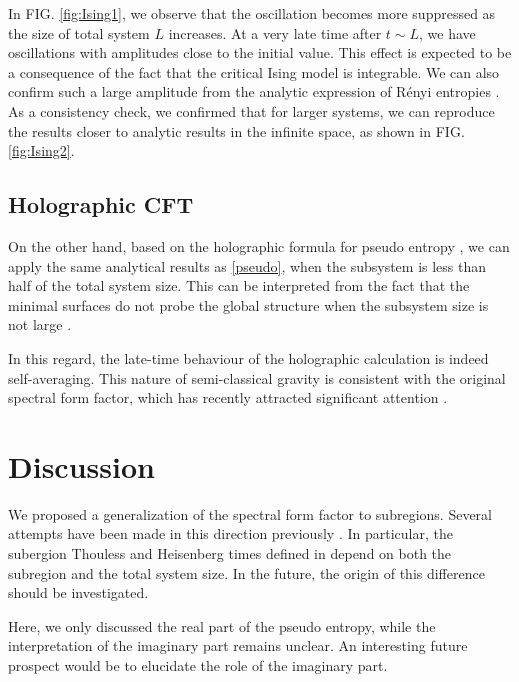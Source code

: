 \documentclass[%
twocolumn, 
secnumarabic,amssymb, preprintnumbers, superscriptaddress, aps, prl]{revtex4-1}
\begin{document}
In FIG. \ref{fig:Ising1}, we observe that the oscillation becomes more suppressed as the size of total system $L$ increases.  At a very late time after $t\sim L$, we have oscillations with amplitudes close to the initial value. This effect is expected to be a consequence of the fact that the critical Ising model is integrable. We can also confirm such a large amplitude from the analytic expression of R\'enyi entropies \cite{Azeyanagi:2007bj,Herzog:2013py}. 
As a consistency check, we confirmed that for larger systems, we can reproduce the results closer to analytic results in the infinite space, as shown in FIG.  \ref{fig:Ising2}.  

\subsection{Holographic CFT}
On the other hand, based on the holographic formula for pseudo entropy \cite{Nakata_2021}, we can apply the same analytical results as \eqref{pseudo}, when the subsystem is less than half of the total system size. This can be interpreted from the fact that the minimal surfaces do not probe the global structure when the subsystem size is not large \cite{Headrick:2007km, Asplund:2014coa}. 

In this regard, the late-time behaviour of the holographic calculation is indeed self-averaging. This nature of semi-classical gravity is consistent with the original spectral form factor, which has recently attracted significant attention \cite{2017JHEP...05..118C,Saad:2018bqo,Saad:2019lba,Penington:2019kki}.

\section{Discussion}
We proposed a generalization of the spectral form factor to subregions.  Several attempts have been made in this direction previously \cite{Chen:2017yzn, Chen:2018hjf, Ma:2020uox}. In particular, the subergion Thouless and Heisenberg times defined in \cite{Chen:2017yzn, Chen:2018hjf} depend on both the subregion and the total system size. In the future, the origin of this difference should be investigated.  %

Here, we only discussed the real part of the pseudo entropy, while the interpretation of the imaginary part remains unclear. An interesting future prospect would be to elucidate the role of the imaginary part.  %
\end{document}
